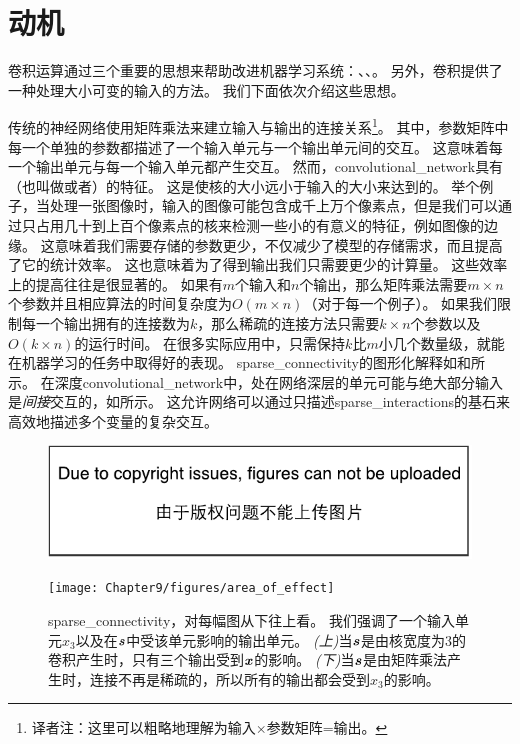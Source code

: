  
\section{动机}
\label{sec:motivation}

卷积运算通过三个重要的思想来帮助改进机器学习系统：、、。
另外，卷积提供了一种处理大小可变的输入的方法。
我们下面依次介绍这些思想。

传统的神经网络使用矩阵乘法来建立输入与输出的连接关系\footnote{译者注：这里可以粗略地理解为输入$\times$参数矩阵=输出。}。
其中，参数矩阵中每一个单独的参数都描述了一个输入单元与一个输出单元间的交互。
这意味着每一个输出单元与每一个输入单元都产生交互。
然而，\gls{convolutional_network}具有（也叫做或者）的特征。
这是使核的大小远小于输入的大小来达到的。
举个例子，当处理一张图像时，输入的图像可能包含成千上万个像素点，但是我们可以通过只占用几十到上百个像素点的核来检测一些小的有意义的特征，例如图像的边缘。
这意味着我们需要存储的参数更少，不仅减少了模型的存储需求，而且提高了它的统计效率。
这也意味着为了得到输出我们只需要更少的计算量。
这些效率上的提高往往是很显著的。
如果有$m$个输入和$n$个输出，那么矩阵乘法需要$m \times n$个参数并且相应算法的时间复杂度为$O(m\times n)$（对于每一个例子）。
如果我们限制每一个输出拥有的连接数为$k$，那么稀疏的连接方法只需要$k\times n$个参数以及$O(k\times n)$的运行时间。
在很多实际应用中，只需保持$k$比$m$小几个数量级，就能在机器学习的任务中取得好的表现。
\gls{sparse_connectivity}的图形化解释如和所示。
在深度\gls{convolutional_network}中，处在网络深层的单元可能与绝大部分输入是\emph{间接}交互的，如所示。
这允许网络可以通过只描述\gls{sparse_interactions}的基石来高效地描述多个变量的复杂交互。
\begin{figure}[!htb]
\ifOpenSource
\centerline{\includegraphics{figure.pdf}}
\else
\centerline{\texttt{[image: Chapter9/figures/area\_of\_effect]}}
\fi
\captionsetup{singlelinecheck=off}
\caption[Caption for LOF]{\gls{sparse_connectivity}，对每幅图从下往上看。
我们强调了一个输入单元$x_3$以及在$\boldsymbol{\mathit{s}}$中受该单元影响的输出单元。
\emph{(上)}当$\boldsymbol{\mathit{s}}$是由核宽度为3的卷积产生时，只有三个输出受到$\boldsymbol{\mathit{x}}$的影响\protect\footnotemark。
\emph{(下)}当$\boldsymbol{\mathit{s}}$是由矩阵乘法产生时，连接不再是稀疏的，所以所有的输出都会受到$x_3$的影响。}
\label{fig:chap9_area_of_effect}
\end{figure}

